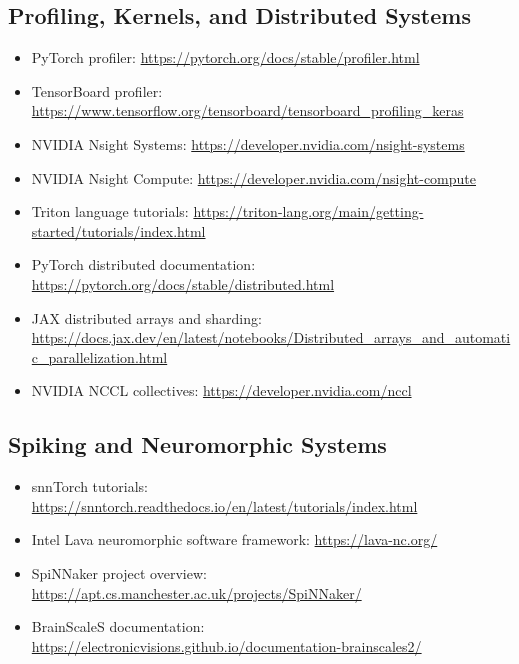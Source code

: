 \subsection*{Profiling, Kernels, and Distributed Systems}
\begin{itemize}[leftmargin=*]
  \item PyTorch profiler: \url{https://pytorch.org/docs/stable/profiler.html}
  \item TensorBoard profiler: \url{https://www.tensorflow.org/tensorboard/tensorboard_profiling_keras}
  \item NVIDIA Nsight Systems: \url{https://developer.nvidia.com/nsight-systems}
  \item NVIDIA Nsight Compute: \url{https://developer.nvidia.com/nsight-compute}
  \item Triton language tutorials: \url{https://triton-lang.org/main/getting-started/tutorials/index.html}
  \item PyTorch distributed documentation: \url{https://pytorch.org/docs/stable/distributed.html}
  \item JAX distributed arrays and sharding: \url{https://docs.jax.dev/en/latest/notebooks/Distributed_arrays_and_automatic_parallelization.html}
  \item NVIDIA NCCL collectives: \url{https://developer.nvidia.com/nccl}
\end{itemize}

\subsection*{Spiking and Neuromorphic Systems}
\begin{itemize}[leftmargin=*]
  \item snnTorch tutorials: \url{https://snntorch.readthedocs.io/en/latest/tutorials/index.html}
  \item Intel Lava neuromorphic software framework: \url{https://lava-nc.org/}
  \item SpiNNaker project overview: \url{https://apt.cs.manchester.ac.uk/projects/SpiNNaker/}
  \item BrainScaleS documentation: \url{https://electronicvisions.github.io/documentation-brainscales2/}
\end{itemize}

